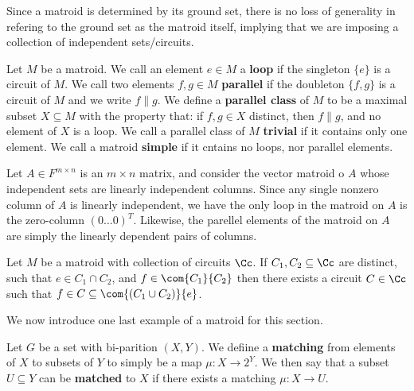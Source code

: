 Since a matroid is determined by its ground set, there is no loss of generality
in refering to the ground set as the matroid itself, implying that we are
imposing a collection of independent sets/circuits.

\begin{definition}
    Let $M$ be a matroid. We call an element $e \in M$ a  \textbf{loop} if the
    singleton $\{e\}$ is a circuit of $M$. We call two elements  $f,g \in M$
     \textbf{parallel} if the doubleton $\{f,g\}$ is a circuit of $M$ and we
     write  $f\|g$. We define a \textbf{parallel class} of $M$ to be a maximal
     subset  $X \subseteq M$ with the property that: if  $f,g \in X$ distinct,
     then $f\|g$, and no element of  $X$ is a loop. We call a parallel class of
     $M$  \textbf{trivial} if it contains only one element. We call a matroid
     \textbf{simple} if it cntains no loops, nor parallel elements.
\end{definition}

\begin{example}\label{1.7}
    Let $A \in F^{m \times n}$ is an $m \times n$ matrix, and consider the
    vector matroid o $A$ whose independent sets are linearly independent
    columns. Since any single nonzero column of  $A$ is linearly independent, we
    have the only loop in the matroid on  $A$ is the zero-column
    $(0 \dots 0)^T$. Likewise, the parellel elements of the matroid on $A$ are
    simply the linearly dependent pairs of columns.
\end{example}

\begin{theorem}\label{1.1.5}
    Let $M$ be a matroid with collection of circuits  $\Cc$. If  $C_1, C_2
    \subseteq \Cc$ are distinct, such that $e \in C_1 \cap C_2$, and $f \in
    \com{C_1}{C_2}$ then there exists a circuit $C \in \Cc$ such that  $f \in C
    \subseteq \com{(C_1 \cup C_2)}{e}$.
\end{theorem}

We now introduce one last example of a matroid for this section.

\begin{definition}
    Let $G$ be a set with bi-parition  $(X,Y)$. We defiine a \textbf{matching}
    from elements of $X$ to subsets of  $Y$ to simply be a map
    $\mu:X \rightarrow 2^Y$. We then say that a subset $U \subseteq Y$ can be
    \textbf{matched} to $X$ if there exists a matching  $\mu:X \rightarrow U$.
\end{definition}

